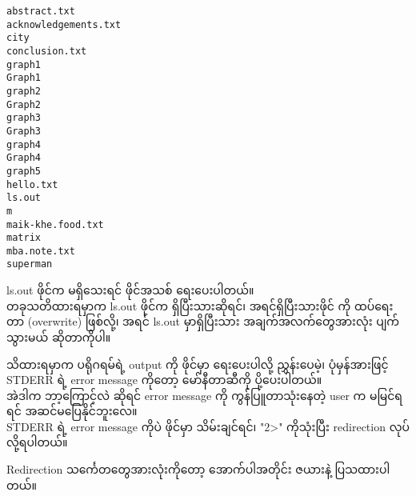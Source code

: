 \documentclass[11pt]{article}
\begin{document}
    \begin{Verbatim}[commandchars=\\\{\}]
abstract.txt
acknowledgements.txt
city
conclusion.txt
graph1
Graph1
graph2
Graph2
graph3
Graph3
graph4
Graph4
graph5
hello.txt
ls.out
m
maik-khe.food.txt
matrix
mba.note.txt
superman

    \end{Verbatim}

    ls.out ဖိုင်က မရှိသေးရင် ဖိုင်အသစ် ရေးပေးပါတယ်။\\
တခုသတိထားရမှာက ls.out ဖိုင်က ရှိပြီးသားဆိုရင်၊ အရင်ရှိပြီးသားဖိုင် ကို
ထပ်ရေးတာ (overwrite) ဖြစ်လို့၊ အရင် ls.out မှာရှိပြီးသား
အချက်အလက်တွေအားလုံး ပျက်သွားမယ် ဆိုတာကိုပါ။

သိထားရမှာက ပရိုဂရမ်ရဲ့ output ကို ဖိုင်မှာ ရေးပေးပါလို့ ညွှန်းပေမဲ့၊
ပုံမှန်အားဖြင့် STDERR ရဲ့ error message ကိုတော့ မော်နီတာဆီကို
ပို့ပေးပါတယ်။\\
အဲဒါက ဘာ့ကြောင့်လဲ ဆိုရင် error message ကို ကွန်ပြူတာသုံးနေတဲ့ user က
မမြင်ရရင် အဆင်မပြေနိုင်ဘူးလေ။\\
STDERR ရဲ့ error message ကိုပဲ ဖိုင်မှာ သိမ်းချင်ရင်၊ "2\textgreater{}"
ကိုသုံးပြီး redirection လုပ်လို့ရပါတယ်။

Redirection သင်္ကေတတွေအားလုံးကိုတော့ အောက်ပါအတိုင်း ဇယားနဲ့ ပြသထားပါတယ်။
\end{document}
